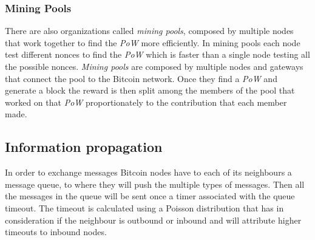 
\subsubsection*{Mining Pools}
There are also organizations called \textit{mining pools}, composed by multiple nodes that work together to find the \textit{PoW} more efficiently. In mining pools each node test different nonces to find the \textit{PoW} which is faster than a single node testing all the possible nonces. \textit{Mining pools} are composed by multiple nodes and gateways that connect the pool to the Bitcoin network. Once they find a \textit{PoW} and generate a block the reward is then split among the members of the pool that worked on that \textit{PoW} proportionately to the contribution that each member made.

\subsection{Information propagation}
\label{sec:dataexchange}
In order to exchange messages Bitcoin nodes have to each of its neighbours a message queue, to where they will push the multiple types of messages. Then all the messages in the queue will be sent once a timer associated with the queue timeout. The timeout is calculated using a Poisson distribution that has in consideration if the neighbour is outbound or inbound and will attribute higher timeouts to inbound nodes.

